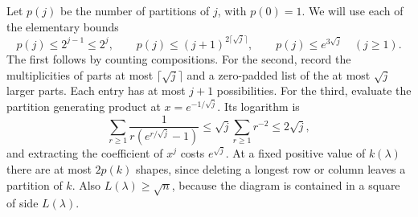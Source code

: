 Let $p(j)$ be the number of partitions of $j$, with $p(0)=1$.
We will use each of the elementary bounds
\begin{equation}\label{l:partition-counts}
 p(j)\le2^{j-1}\le2^j,\qquad
 p(j)\le(j+1)^{2\lceil\sqrt j\rceil},\qquad
 p(j)\le e^{3\sqrt j}\quad(j\ge1).
\end{equation}
The first follows by counting compositions.  For the second, record
the multiplicities of parts at most $\lceil\sqrt j\rceil$ and a
zero-padded list of the at most $\sqrt j$ larger parts.  Each entry
has at most $j+1$ possibilities.  For the third, evaluate the partition
generating product at $x=e^{-1/\sqrt j}$.  Its logarithm is
\[
 \sum_{r\ge1}\frac1{r(e^{r/\sqrt j}-1)}
 \le\sqrt j\sum_{r\ge1}r^{-2}\le2\sqrt j,
\]
and extracting the coefficient of $x^j$ costs $e^{\sqrt j}$.
At a fixed positive value of $k(\lambda)$ there are at most $2p(k)$
shapes, since deleting a longest row or column leaves a partition of
$k$.  Also $L(\lambda)\ge\sqrt n$, because the diagram is contained
in a square of side $L(\lambda)$.

